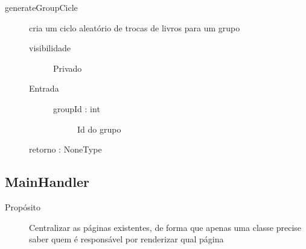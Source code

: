 \documentclass[a4paper]{article}
\begin{document}
\begin{description}
\begin{description}
			\end{description} %
			
			\item [generateGroupCicle] cria um ciclo aleatório de trocas de livros para um grupo
			\begin{description} %
			 \item [visibilidade] Privado
			 \item [Entrada] \mbox{}
				\begin{description} %
				 \item [groupId : int] Id do grupo
				\end{description} %
				
			 \item [retorno : NoneType ]
				
			\end{description} %
			
		\end{description} %
		
	\subsection{MainHandler}
	
	\begin{description}
		\item [Propósito] Centralizar as páginas existentes, de forma que apenas uma classe precise saber quem é responsável por renderizar qual página
	\end{description}
	
\end{document}
